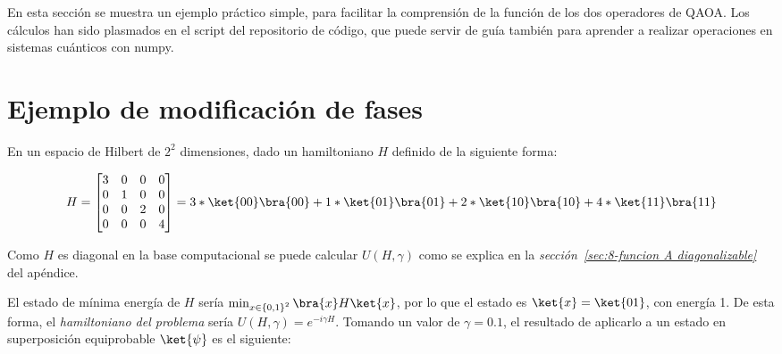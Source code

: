 En esta sección se muestra un ejemplo práctico simple, para facilitar la comprensión de la función de los dos operadores de QAOA\@.
Los cálculos han sido plasmados en el script  del repositorio de código\cite{codigo_tfg}, que puede servir de guía también para aprender a realizar operaciones en sistemas cuánticos con numpy.


\section{Ejemplo de modificación de fases\label{sec:8-ejemplo de modificacion de fases}}

En un espacio de Hilbert de $2^2$ dimensiones, dado un hamiltoniano $H$ definido de la siguiente forma:

\begin{align}\label{eq:apendice_ejemplo_operador_C}
  H = \begin{bmatrix}
    3 & 0 & 0 & 0 \\
    0 & 1 & 0 & 0 \\
    0 & 0 & 2 & 0 \\
    0 & 0 & 0 & 4
  \end{bmatrix} = 3*\ket{00}\bra{00} + 1*\ket{01}\bra{01} + 2*\ket{10}\bra{10} + 4*\ket{11}\bra{11}
\end{align}

Como $H$ es diagonal en la base computacional se puede calcular $U(H, \gamma)$ como se explica en la \textit{sección~\ref{sec:8-funcion A diagonalizable}} del apéndice.

El estado de mínima energía de $H$ sería $\min_{x \in {\{0, 1\}}^2}{\bra{x}H\ket{x}}$, por lo que el estado es $\ket{x} = \ket{01}$, con energía 1.
De esta forma, el \textit{hamiltoniano del problema} sería $U(H, \gamma) = e^{-i \gamma H}$. Tomando un valor de $\gamma = 0.1$, el resultado de aplicarlo a un estado en superposición equiprobable $\ket{\psi}$ es el siguiente:

